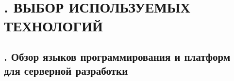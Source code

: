 \setcounter{chaptercntr}{2}

\sectionbreak \section*{
  \gostTitleFont
  \redline
  \thechaptercntr .
  ВЫБОР ИСПОЛЬЗУЕМЫХ ТЕХНОЛОГИЙ
}

\titlespace

\subsection*{
  \gostTitleFont
  \redline
  \thechaptercntr .\thesubchaptercntr \spc
  Обзор языков программирования и платформ для серверной разработки
} \addtocounter{subchaptercntr}{1}

\subtitlespace

